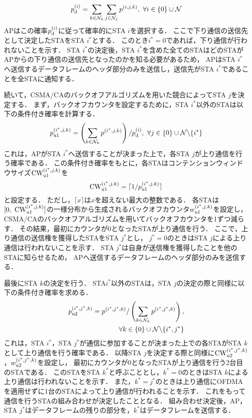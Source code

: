 \documentclass[technicalreport]{ieicej}
\newcommand{\mthnj}{{\mathcal N}_j}
\newcommand{\mthnk}{{\mathcal N}_k}
\begin{document}
		\begin{equation}
			p_{\rm d}^{(i)}= \sum_{k\in\mthnk}\sum_{j\in\mthnj}p^{(i,j,k)}, \ \forall i \in \{0\}\cup{\mathcal N}
		\end{equation}
		APはこの確率$p_{\rm d}^{(i)}$に従って確率的にSTA $i$を選択する．
		ここで下り通信の送信先として決定したSTAをSTA $i^*$とする．
		このとき$i^*=0$であれば，下り通信が行われないことを示す．
		STA $i^*$の決定後，STA $i^*$を含めた全てのSTAはどのSTAがAPからの下り通信の送信先となったのかを知る必要があるため，
		APはSTA $i^*$へ送信するデータフレームのヘッダ部分のみを送信し，送信先がSTA $i^*$であることを全STAに通知する．
		\par
		続いて，CSMA/CAのバックオフアルゴリズムを用いた競合によってSTA $j$を決定する．
		まず，バックオフカウンタを設定するために，STA $i^*$以外のSTAは以下の条件付き確率を計算する．
		\begin{align}
			p_{\rm u1}^{(i^*,j,k)}=\left(\sum_{k\in\mthnk} p^{(i^*,j,k)}\right) / p_{\rm d}^{(i)},\ \forall j \in \{0\}\cup{\mathcal N}\backslash \{i^*\}
		\end{align}
		これは，APがSTA $i^*$へ送信することが決まった上で，各STA $j$が上り通信を行う確率である．
		この条件付き確率をもとに，各STAはコンテンションウィンドウサイズ${\rm CW}^{(i^*,j,k)}_{\rm u1}$を
		\begin{equation}
			{\rm CW}^{(i^*,j,k)}_{\rm u1} = \lceil 1/p_{\rm u1}^{(i^*,j,k)} \rceil
		\end{equation}
		と設定する．
		ただし，$\lceil x \rceil$は$x$を超えない最大の整数である．
		各STAは$[0,\ {\rm CW}^{(i^*,j,k)}_{\rm u1}]$の一様分布から生成されるバックオフカウンタ$w_{\rm u1}^{(i^*,j,k)}$を設定し，
		CSMA/CAのバックオフアルゴリズムを用いてバックオフカウンタを1ずつ減らす．
		その結果，最初にカウンタが0となったSTAが上り通信を行う．
		ここで，上り通信の送信権を獲得したSTAをSTA $j^*$とし，
		$j^*=0$のときはSTA $j$による上り通信は行われないことを示す．
		STA $j^*$は自身が送信権を獲得したことを他のSTAに知らせるため，
		APへ送信するデータフレームのヘッダ部分のみを送信する．
		\par
		最後にSTA $k$の決定を行う．
		STA$i^*$以外のSTAは，STA $j$の決定の際と同様に以下の条件付き確率を求める．
		\begin{align}
			p_{\rm u2}^{(i^*,j^*,k)}=p^{(i^*,j^*,k)} / \left(\sum_{k\in\mthnk} p^{(i^*,j^*,k)}\right), \nonumber\\
			\qquad\qquad\forall k \in \{0\}\cup{\mathcal N}\backslash \{i^*,j^*\}
		\end{align}
		これは，STA $i^*$，STA $j^*$が通信に参加することが決まった上での各STAがSTA $k$として上り通信を行う確率である．
		以降STA $j$を決定する際と同様に${\rm CW}^{(i^*,j^*,k)}_{\rm u2}$，$w_{\rm u2}^{(i^*,j^*,k)}$を設定し，
		最初にカウンタが0となったSTAが上り通信を行う2台目のSTAである．
		このSTAをSTA $k^*$と呼ぶこととし，$k^*=0$のときはSTA $k$による上り通信は行われないことを示す．
		また，$k^*=j^*$のときは上り通信にOFDMAを適用せずに1台のSTAによって上り通信が行われることを示す．
		これをもって通信を行うSTAの組み合わせが決定したこととなる．
		組み合わせ決定後，AP，STA $j^*$はデータフレームの残りの部分を，$k^*$はデータフレームを送信する．
\end{document}
